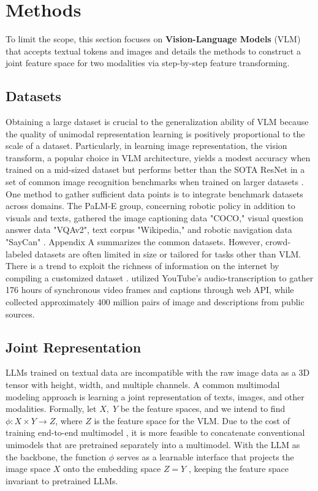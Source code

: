 \documentclass[11pt]{article}
\begin{document}
\section{Methods}
 To limit the scope, this section focuses on \textbf{Vision-Language Models} (VLM) that accepts textual tokens and images and details the methods to construct a joint feature space for two modalities via step-by-step feature transforming. 

\subsection{Datasets}
Obtaining a large dataset is crucial to the generalization ability of VLM because the quality of unimodal representation learning is positively proportional to the scale of a dataset. Particularly, in learning image representation, the vision transform, a popular choice in VLM architecture, yields a modest accuracy when trained on a mid-sized dataset but performs better than the SOTA ResNet in a set of common image recognition benchmarks when trained on larger datasets \citep{DBLP:conf/iclr/DosovitskiyB0WZ21}. One method to gather sufficient data points is to integrate benchmark datasets across domains. The PaLM-E group, concerning robotic policy in addition to visuals and texts, gathered the image captioning data "COCO," visual question answer data "VQAv2", text corpus "Wikipedia," and robotic navigation data "SayCan" \citet{DBLP:conf/icml/DriessXSLCIWTVY23}. Appendix A summarizes the common datasets. However, crowd-labeled datasets are often limited in size or tailored for tasks other than VLM. There is a trend to exploit the richness of information on the internet by compiling a customized dataset \citep{DBLP:conf/icml/RadfordKHRGASAM21}. \citet{DBLP:conf/iccv/SunMV0S19} utilized YouTube's audio-transcription to gather 176 hours of synchronous video frames and captions through web API, while \citet{DBLP:conf/icml/RadfordKHRGASAM21} collected approximately 400 million pairs of image and descriptions from public sources. 


\subsection{Joint Representation}
LLMs trained on textual data are incompatible with the raw image data as a 3D tensor with height, width, and multiple channels. A common multimodal modeling approach is learning a joint representation of texts, images, and other modalities. Formally, let $X,\; Y$ be the feature spaces, and we intend to find $\phi: X\times Y \rightarrow Z$, where $Z$ is the feature space for the VLM. Due to the cost of training end-to-end multimodel \citep{DBLP:journals/corr/abs-2306-13549}, it is more feasible to concatenate conventional unimodels that are pretrained separately into a multimodel. With the LLM as the backbone, the function $\phi$ serves as a learnable interface that projects the image space $X$ onto the embedding space $Z=Y$ \citep{DBLP:journals/corr/abs-2306-13549}, keeping the feature space invariant to pretrained LLMs. 
\end{document}
